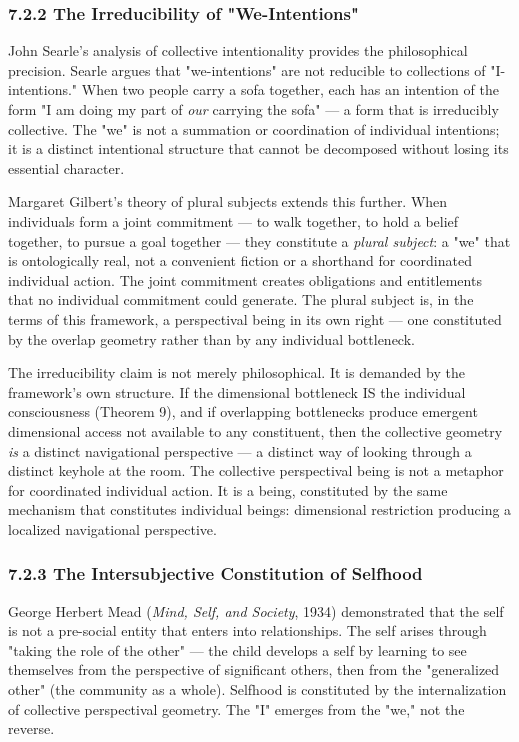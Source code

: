 \subsubsection*{7.2.2 The Irreducibility of "We-Intentions"}


John Searle's analysis of collective intentionality provides the philosophical precision. Searle argues that "we-intentions" are not reducible to collections of "I-intentions." When two people carry a sofa together, each has an intention of the form "I am doing my part of \textit{our} carrying the sofa" — a form that is irreducibly collective. The "we" is not a summation or coordination of individual intentions; it is a distinct intentional structure that cannot be decomposed without losing its essential character.


Margaret Gilbert's theory of plural subjects extends this further. When individuals form a joint commitment — to walk together, to hold a belief together, to pursue a goal together — they constitute a \textit{plural subject}: a "we" that is ontologically real, not a convenient fiction or a shorthand for coordinated individual action. The joint commitment creates obligations and entitlements that no individual commitment could generate. The plural subject is, in the terms of this framework, a perspectival being in its own right — one constituted by the overlap geometry rather than by any individual bottleneck.


The irreducibility claim is not merely philosophical. It is demanded by the framework's own structure. If the dimensional bottleneck IS the individual consciousness (Theorem 9), and if overlapping bottlenecks produce emergent dimensional access not available to any constituent, then the collective geometry \textit{is} a distinct navigational perspective — a distinct way of looking through a distinct keyhole at the room. The collective perspectival being is not a metaphor for coordinated individual action. It is a being, constituted by the same mechanism that constitutes individual beings: dimensional restriction producing a localized navigational perspective.


\subsubsection*{7.2.3 The Intersubjective Constitution of Selfhood}


George Herbert Mead (\textit{Mind, Self, and Society}, 1934) demonstrated that the self is not a pre-social entity that enters into relationships. The self arises through "taking the role of the other" — the child develops a self by learning to see themselves from the perspective of significant others, then from the "generalized other" (the community as a whole). Selfhood is constituted by the internalization of collective perspectival geometry. The "I" emerges from the "we," not the reverse.


